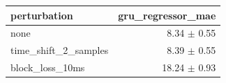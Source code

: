 \begin{tabular}{lr}
\toprule
perturbation & gru\_regressor\_mae \\
\midrule
none & 8.34 $\pm$ 0.55 \\
time\_shift\_2\_samples & 8.39 $\pm$ 0.55 \\
block\_loss\_10ms & 18.24 $\pm$ 0.93 \\
\bottomrule
\end{tabular}
